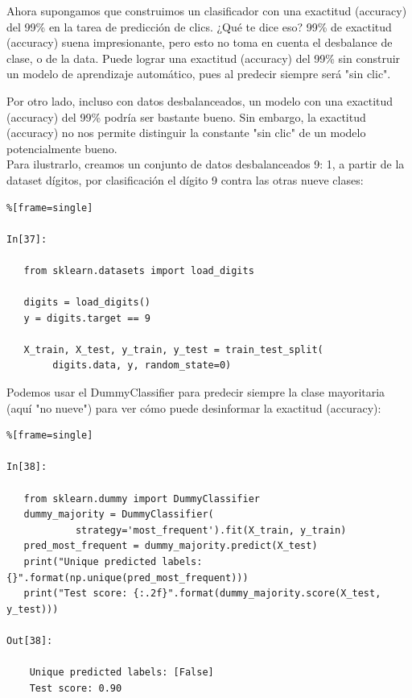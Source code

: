 {Ahora supongamos que construimos  un clasificador con una exactitud (accuracy) del 99\% en la tarea de  predicción de clics.  ¿Qué te dice eso?  99\%  de  exactitud (accuracy) suena impresionante,  pero esto no toma en cuenta el desbalance  de clase, o de la data. Puede lograr una  exactitud (accuracy)  del 99\% sin construir un modelo de aprendizaje automático, pues al predecir siempre será  "{}sin clic"{}. 

Por otro lado, incluso con datos desbalanceados, un modelo con una exactitud (accuracy) del 99\% podría ser bastante bueno.   Sin embargo, la exactitud (accuracy) no nos permite distinguir la  constante  "{}sin clic"{}  de un modelo potencialmente  bueno.\\

Para ilustrarlo, creamos un conjunto de datos desbalanceados  9: 1,  a partir de la dataset  dígitos, por clasificación el dígito 9 contra las otras nueve clases:

   
\begin{lstlisting}%[frame=single]

In[37]:

   from sklearn.datasets import load_digits
   
   digits = load_digits()
   y = digits.target == 9
   
   X_train, X_test, y_train, y_test = train_test_split(
        digits.data, y, random_state=0)

\end{lstlisting}


Podemos usar el {\ttfamily DummyClassifier} para predecir siempre la clase mayoritaria (aquí "{}no nueve"{}) para ver cómo  puede  desinformar la  exactitud (accuracy):

\begin{lstlisting}%[frame=single]

In[38]:
   
   from sklearn.dummy import DummyClassifier
   dummy_majority = DummyClassifier(
            strategy='most_frequent').fit(X_train, y_train)
   pred_most_frequent = dummy_majority.predict(X_test)
   print("Unique predicted labels: {}".format(np.unique(pred_most_frequent)))
   print("Test score: {:.2f}".format(dummy_majority.score(X_test, y_test)))

Out[38]:
   
    Unique predicted labels: [False]
    Test score: 0.90

\end{lstlisting}

}
